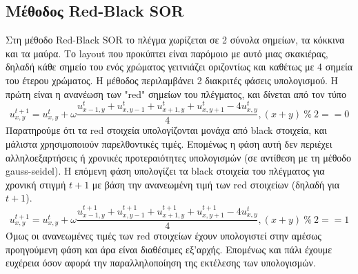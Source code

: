 \documentclass[11pt,a4paper]{article}
\begin{document}
\subsection{Μέθοδος Red-Black SOR}
Στη μέθοδο Red-Black SOR το πλέγμα χωρίζεται σε 2 σύνολα σημείων, τα κόκκινα και τα μαύρα. Το layout που προκύπτει είναι παρόμοιο με αυτό μιας σκακιέρας, δηλαδή κάθε σημείο του ενός χρώματος γειτνιάζει οριζοντίως και καθέτως με 4 σημεία του έτερου χρώματος.
Η μέθοδος περιλαμβάνει 2 διακριτές φάσεις υπολογισμού. Η πρώτη είναι η ανανέωση των "red" σημείων του πλέγματος, και δίνεται από τον τύπο
\[ u_{x,y}^{t+1} = u_{x,y}^t + \omega \frac{u_{x-1,y}^t + u_{x,y-1}^t + u_{x+1, y}^t + u_{x, y+1}^t - 4u_{x,y}^t}{4}, (x+y)\  \% \  2 == 0 \]
Παρατηρούμε ότι τα red στοιχεία υπολογίζονται μονάχα από black στοιχεία, και μάλιστα χρησιμοποιούν παρελθοντικές τιμές. Επομένως η φάση αυτή δεν περιέχει αλληλοεξαρτήσεις ή χρονικές προτεραιότητες υπολογισμών (σε αντίθεση με τη μέθοδο gauss-seidel). Η επόμενη φάση υπολογίζει τα black στοιχεία του πλέγματος για χρονική στιγμή $t+1$ με βάση την ανανεωμένη τιμή των red στοιχείων (δηλαδή για $t+1$).
\[u_{x,y}^{t+1} = u_{x,y}^t + \omega \frac{u_{x-1,y}^{t+1} + u_{x,y-1}^{t+1} + u_{x+1, y}^{t+1} + u_{x, y+1}^{t+1} - 4u_{x,y}^t}{4}, (x+y)\  \% \  2 == 1 \]
Όμως οι ανανεωμένες τιμές των red στοιχείων έχουν υπολογιστεί στην αμέσως προηγούμενη φάση και άρα είναι διαθέσιμες εξ'αρχής. Επομένως και πάλι έχουμε ευχέρεια όσον αφορά την παραλληλοποίηση της εκτέλεσης των υπολογισμών.
\end{document}
